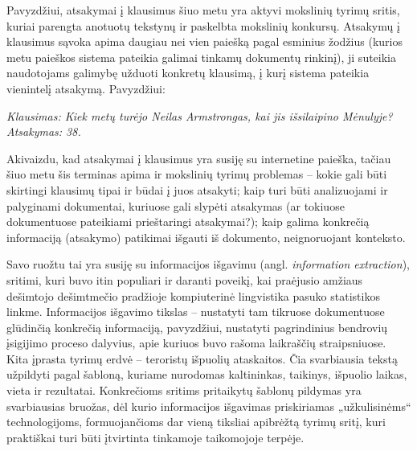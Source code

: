 \documentclass[]{../metanetpaper}
\begin{document}
\begin{multicols}{2}

Pavyzdžiui, atsakymai į klausimus šiuo metu yra aktyvi mokslinių tyrimų sritis, kuriai parengta anotuotų tekstynų ir paskelbta mokslinių konkursų. Atsakymų į klausimus sąvoka apima daugiau nei vien paiešką pagal esminius žodžius (kurios metu paieškos sistema pateikia galimai tinkamų dokumentų rinkinį), ji suteikia naudotojams galimybę užduoti konkretų klausimą, į kurį sistema pateikia vienintelį atsakymą. Pavyzdžiui:

\textit{Klausimas: Kiek metų turėjo Neilas Armstrongas, kai jis išsilaipino Mėnulyje?}\\
\textit{Atsakymas: 38.}

Akivaizdu, kad atsakymai į klausimus yra susiję su internetine paieška, tačiau šiuo metu šis terminas apima ir mokslinių tyrimų problemas – kokie gali būti skirtingi klausimų tipai ir būdai į juos atsakyti; kaip turi būti analizuojami ir palyginami dokumentai, kuriuose gali slypėti atsakymas (ar tokiuose dokumentuose pateikiami prieštaringi atsakymai?); kaip galima konkrečią informaciją (atsakymo) patikimai išgauti iš dokumento, neignoruojant konteksto.    

Savo ruožtu tai yra susiję su informacijos išgavimu (angl. \textit{information extraction}), sritimi, kuri buvo itin populiari ir daranti poveikį, kai praėjusio amžiaus dešimtojo dešimtmečio pradžioje kompiuterinė lingvistika pasuko statistikos linkme. Informacijos išgavimo tikslas – nustatyti tam tikruose dokumentuose glūdinčią konkrečią informaciją, pavyzdžiui, nustatyti pagrindinius bendrovių įsigijimo proceso dalyvius, apie kuriuos buvo rašoma laikraščių straipsniuose. Kita įprasta tyrimų erdvė – teroristų išpuolių ataskaitos. Čia svarbiausia tekstą užpildyti pagal šabloną, kuriame nurodomas kaltininkas, taikinys, išpuolio laikas, vieta ir rezultatai. Konkrečioms sritims pritaikytų šablonų pildymas yra svarbiausias bruožas, dėl kurio informacijos išgavimas priskiriamas „užkulisinėms“ technologijoms, formuojančioms dar vieną tiksliai apibrėžtą tyrimų sritį, kuri praktiškai turi būti įtvirtinta tinkamoje taikomojoje terpėje.    


\end{multicols}
\end{document}

